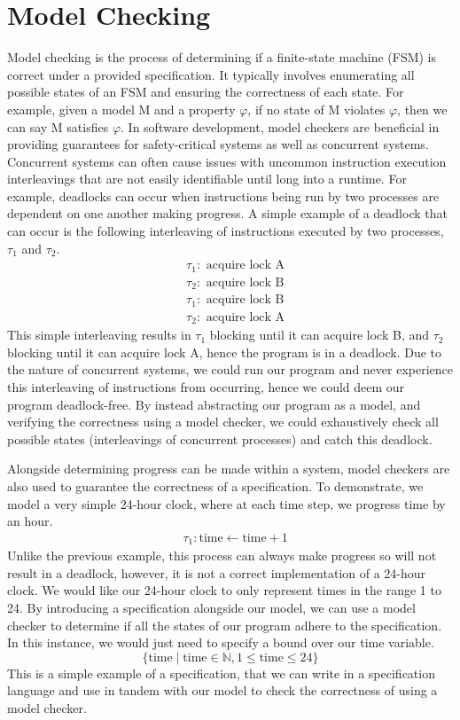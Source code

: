 \section[]{Model Checking}
Model checking is the process of determining if a finite-state machine (FSM) is correct under a provided specification. It typically involves enumerating all possible states of an FSM and ensuring the correctness of each state. For example, given a model M and a property $\varphi$, if no state of M violates $\varphi$, then we can say M satisfies $\varphi$. In software development, model checkers are beneficial in providing guarantees for safety-critical systems as well as concurrent systems. Concurrent systems can often cause issues with uncommon instruction execution interleavings that are not easily identifiable until long into a runtime. For example, deadlocks can occur when instructions being run by two processes are dependent on one another making progress. A simple example of a deadlock that can occur is the following interleaving of instructions executed by two processes, $\tau_1$ and $\tau_2$. 
\[
\begin{aligned}
& \tau_1: \text{ acquire lock A} \\
& \tau_2: \text{ acquire lock B} \\
& \tau_1: \text{ acquire lock B} \\
& \tau_2: \text{ acquire lock A}
\end{aligned}
\]
This simple interleaving results in $\tau_1$ blocking until it can acquire lock B, and $\tau_2$ blocking until it can acquire lock A, hence the program is in a deadlock. Due to the nature of concurrent systems, we could run our program and never experience this interleaving of instructions from occurring, hence we could deem our program deadlock-free. By instead abstracting our program as a model, and verifying the correctness using a model checker, we could exhaustively check all possible states (interleavings of concurrent processes) and catch this deadlock. 
\par
Alongside determining progress can be made within a system, model checkers are also used to guarantee the correctness of a specification. To demonstrate, we model a very simple 24-hour clock, where at each time step, we progress time by an hour.
\[
\begin{aligned}
& \tau_1: \text{time} \leftarrow \text{time} + 1
\end{aligned}
\]
Unlike the previous example, this process can always make progress so will not result in a deadlock, however, it is not a correct implementation of a 24-hour clock. We would like our 24-hour clock to only represent times in the range 1 to 24. By introducing a specification alongside our model, we can use a model checker to determine if all the states of our program adhere to the specification. In this instance, we would just need to specify a bound over our time variable.
\[
\{ \text{time} \mid \text{time} \in \mathbb{N}, 1 \leq \text{time} \leq 24 \}
\]
This is a simple example of a specification, that we can write in a specification language and use in tandem with our model to check the correctness of using a model checker.
